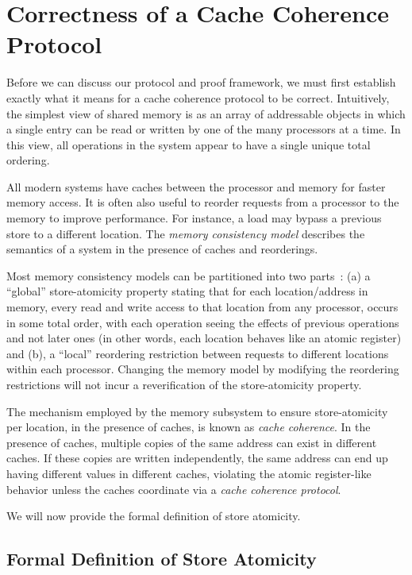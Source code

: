 \section{Correctness of a Cache Coherence Protocol}
\label{Background}

Before we can discuss our protocol and proof framework, we must first
establish exactly what it means for a cache coherence protocol to be
correct. Intuitively, the simplest view of shared memory is as an
array of addressable objects in which a single entry can be read or
written by one of the many processors at a time.  In this view, all
operations in the system appear to have a single unique total
ordering.

All modern systems have caches between the processor and memory for faster
memory access. It is often also useful to reorder requests from a processor to
the memory to improve performance. For instance, a load may bypass a previous
store to a different location. The \emph{memory consistency model} describes
the semantics of a system in the presence of caches and reorderings.

Most memory consistency models can be partitioned into two
parts~\cite{Arvind-memory-model}: (a) a ``global'' store-atomicity property
stating that for each location/address in memory, every read and write access
to that location from any processor, occurs in some total order, with
each operation seeing the effects of previous operations and not later ones (in
other words, each location behaves like an atomic register) and (b), a
``local'' reordering restriction between requests to different locations within
each processor. Changing the memory model by modifying the reordering
restrictions will not incur a reverification of the store-atomicity property.

The mechanism employed by the memory subsystem to ensure store-atomicity per
location, in the presence of caches, is known as \emph{cache coherence}. In the
presence of caches, multiple copies of the same address can exist in different
caches. If these copies are written independently, the same address can end up
having different values in different caches, violating the atomic register-like
behavior unless the caches coordinate via a \emph{cache coherence protocol}.

We will now provide the formal definition of store atomicity.

\subsection{Formal Definition of Store Atomicity}

